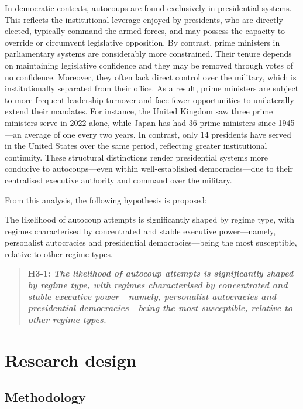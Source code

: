 \documentclass[
  12pt,
]{report}
\begin{document}
In democratic contexts, autocoups are found exclusively in presidential
systems. This reflects the institutional leverage enjoyed by presidents,
who are directly elected, typically command the armed forces, and may
possess the capacity to override or circumvent legislative opposition.
By contrast, prime ministers in parliamentary systems are considerably
more constrained. Their tenure depends on maintaining legislative
confidence and they may be removed through votes of no confidence.
Moreover, they often lack direct control over the military, which is
institutionally separated from their office. As a result, prime
ministers are subject to more frequent leadership turnover and face
fewer opportunities to unilaterally extend their mandates. For instance,
the United Kingdom saw three prime ministers serve in 2022 alone, while
Japan has had 36 prime ministers since 1945---an average of one every
two years. In contrast, only 14 presidents have served in the United
States over the same period, reflecting greater institutional
continuity. These structural distinctions render presidential systems
more conducive to autocoups---even within well-established
democracies---due to their centralised executive authority and command
over the military.

From this analysis, the following hypothesis is proposed:

The likelihood of autocoup attempts is significantly shaped by regime
type, with regimes characterised by concentrated and stable executive
power---namely, personalist autocracies and presidential
democracies---being the most susceptible, relative to other regime
types.

\begin{quote}
\textbf{H3-1: \emph{The likelihood of autocoup attempts is significantly
shaped by regime type, with regimes characterised by concentrated and
stable executive power---namely, personalist autocracies and
presidential democracies---being the most susceptible, relative to other
regime types.}}
\end{quote}

\section{Research design}\label{research-design}

\subsection*{Methodology}\label{methodology}
\end{document}
